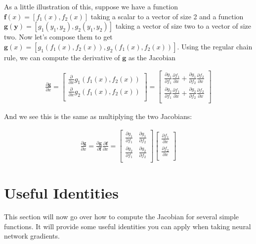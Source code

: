 \documentclass{article}[11pt]
\newcommand{\bmf} { \bm{f} }
\newcommand{\by} { \bm{y} }
\newcommand{\bg} { \bm{g} }
\newcommand{\alns}[1] {
	\begin{align*} #1 \end{align*}
}
\newcommand{\pd}[2] {
 \frac{\partial #1}{\partial #2}
}
\begin{document}
As a little illustration of this, suppose we have a function $\bmf(x) = [f_1(x), f_2(x)]$ taking a scalar to a vector of size 2 and a function $\bg(\by) = [g_1(y_1, y_2), g_2(y_1, y_2)]$ taking a vector of size two to a vector of size two. Now let's compose them to get $\bg(x) = [g_1(f_1(x), f_2(x)), g_2(f_1(x), f_2(x))]$. Using the regular chain rule, we can compute the derivative of $\bg$ as the Jacobian
\alns{
	\pd{\bg}{x} = \begin{bmatrix}
		\pd{}{x}g_1(f_1(x), f_2(x))  \\
		\pd{}{x}g_2(f_1(x), f_2(x)) \\
	\end{bmatrix} =  \begin{bmatrix}
		\pd{g_1}{f_1}\pd{f_1}{x} + \pd{g_1}{f_2}\pd{f_2}{x}   \\
		\pd{g_2}{f_1}\pd{f_1}{x} + \pd{g_2}{f_2}\pd{f_2}{x}  \\
	\end{bmatrix} 
}
And we see this is the same as multiplying the two Jacobians:
\alns{
\pd{\bg}{x} = \pd{\bg}{\bmf}\pd{\bmf}{x} = \begin{bmatrix}
	\pd{g_1}{f_1} & \pd{g_1}{f_2} \\
	\pd{g_2}{f_1} & \pd{g_2}{f_2} \\	
\end{bmatrix} 
\begin{bmatrix}
	\pd{f_1}{x} \\
	\pd{f_2}{x} \\	
\end{bmatrix} 
}

\section{Useful Identities}
This section will now go over how to compute the Jacobian for several simple functions. It will provide some useful identities you can apply when taking neural network gradients. \\
\end{document}
